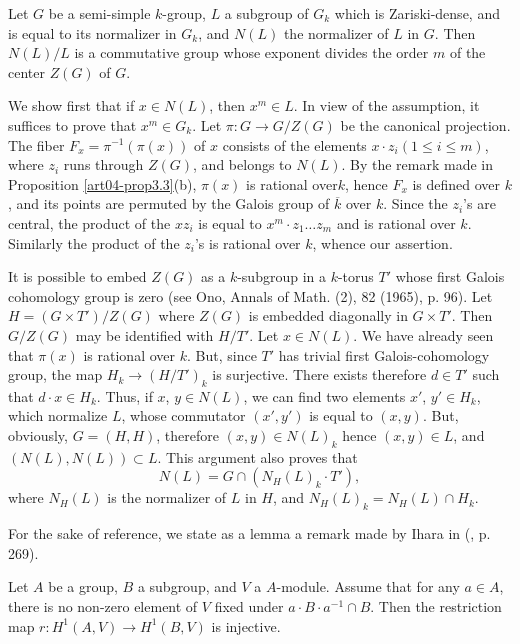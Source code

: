 \begin{proposition}\label{art04-prop3.4}
Let $G$ be a semi-simple $k$-group, $L$ a subgroup of $G_{k}$ which is Zariski-dense, and is equal to its normalizer in $G_{k}$, and $N(L)$ the normalizer of $L$ in $G$. Then $N(L)/L$ is a commutative group whose exponent divides the order $m$ of the center $Z(G)$ of $G$.
\end{proposition}

We show first that if $x\in N(L)$, then $x^{m}\in L$. In view of the assumption, it suffices to prove that $x^{m}\in G_{k}$. Let $\pi:G\to G/Z(G)$ be the canonical projection. The fiber $F_{x}=\pi^{-1}(\pi(x))$ of $x$ consists of the elements $x\cdot z_{i}(1\leq i\leq m)$, where $z_{i}$ runs through $Z(G)$, and belongs to $N(L)$. By the remark made in Proposition \ref{art04-prop3.3}(b), $\pi(x)$ is rational over\pageoriginale $k$, hence $F_{x}$ is defined over $k$, and its points are permuted by the Galois group of $\overline{k}$ over $k$. Since the $z_{i}$'s are central, the product of the $xz_{i}$ is equal to $x^{m}\cdot z_{1}\ldots z_{m}$ and is rational over $k$. Similarly the product of the $z_{i}$'s is rational over $k$, whence our assertion.

It is possible to embed $Z(G)$ as a $k$-subgroup in a $k$-torus $T'$ whose first Galois cohomology group is zero (see Ono, Annals of Math. (2), 82 (1965), p. 96). Let $H=(G\times T')/Z(G)$ where $Z(G)$ is embedded diagonally in $G\times T'$. Then $G/Z(G)$ may be identified with $H/T'$. Let $x\in N(L)$. We have already seen that $\pi(x)$ is rational over $k$. But, since $T'$ has trivial first Galois-cohomology group, the map $H_{k}\to (H/T')_{k}$ is surjective. There exists therefore $d\in T'$ such that $d\cdot x\in H_{k}$. Thus, if $x$, $y\in N(L)$, we can find two elements $x'$, $y'\in H_{k}$, which normalize $L$, whose commutator $(x',y')$ is equal to $(x,y)$. But, obviously, $G=(H,H)$, therefore $(x,y)\in N(L)_{k}$ hence $(x,y)\in L$, and $(N(L),N(L))\subset L$. This argument also proves that
\setcounter{equation}{0}
\begin{equation}
N(L)=G\cap (N_{H}(L)_{k}\cdot T'),\label{art04-prop3.4-eq1}
\end{equation}
where $N_{H}(L)$ is the normalizer of $L$ in $H$, and $N_{H}(L)_{k}=N_{H}(L)\cap H_{k}$.

For the sake of reference, we state as a lemma a remark made by Ihara in (\cite{art04-key14}, p. 269).

\begin{lemma}\label{art04-lem3.5}
Let $A$ be a group, $B$ a subgroup, and $V$ a $A$-module. Assume that for any $a\in A$, there is no non-zero element of $V$ fixed under $a\cdot B\cdot a^{-1}\cap B$. Then the restriction map $r:H^{1}(A,V)\to H^{1}(B,V)$ is injective.
\end{lemma}

